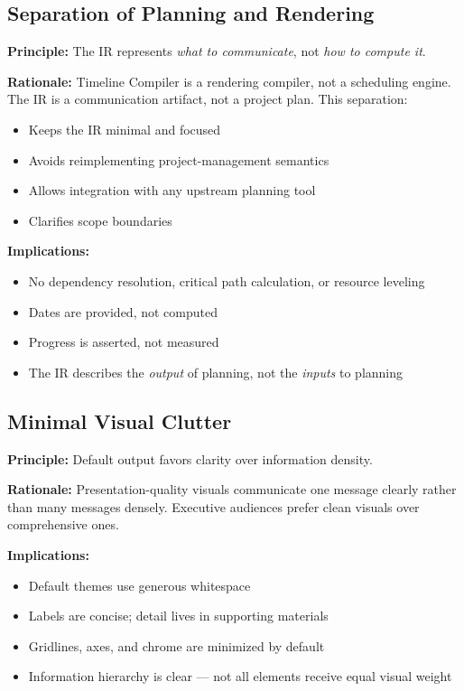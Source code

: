 \subsection{Separation of Planning and Rendering}
\label{principle:separation}

\textbf{Principle:} The IR represents \emph{what to communicate}, not \emph{how to compute it}.

\textbf{Rationale:} Timeline Compiler is a rendering compiler, not a scheduling engine. The IR is a communication artifact, not a project plan. This separation:
\begin{itemize}
  \item Keeps the IR minimal and focused
  \item Avoids reimplementing project-management semantics
  \item Allows integration with any upstream planning tool
  \item Clarifies scope boundaries
\end{itemize}

\textbf{Implications:}
\begin{itemize}
  \item No dependency resolution, critical path calculation, or resource leveling
  \item Dates are provided, not computed
  \item Progress is asserted, not measured
  \item The IR describes the \emph{output} of planning, not the \emph{inputs} to planning
\end{itemize}

\subsection{Minimal Visual Clutter}
\label{principle:minimal-clutter}

\textbf{Principle:} Default output favors clarity over information density.

\textbf{Rationale:} Presentation-quality visuals communicate one message clearly rather than many messages densely. Executive audiences prefer clean visuals over comprehensive ones.

\textbf{Implications:}
\begin{itemize}
  \item Default themes use generous whitespace
  \item Labels are concise; detail lives in supporting materials
  \item Gridlines, axes, and chrome are minimized by default
  \item Information hierarchy is clear — not all elements receive equal visual weight
\end{itemize}


